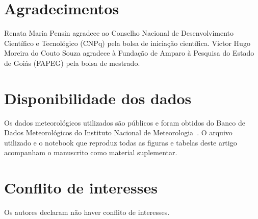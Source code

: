 \section*{Agradecimentos}
Renata Maria Pensin agradece ao Conselho Nacional de Desenvolvimento Científico e Tecnológico (CNPq) pela bolsa de iniciação científica. Victor Hugo Moreira do Couto Souza agradece à Fundação de Amparo à Pesquisa do Estado de Goiás (FAPEG) pela bolsa de mestrado.

\section*{Disponibilidade dos dados}
Os dados meteorológicos utilizados são públicos e foram obtidos do Banco de Dados Meteorológicos do Instituto Nacional de Meteorologia~\cite{inmet2025}. O arquivo utilizado e o notebook que reproduz todas as figuras e tabelas deste artigo acompanham o manuscrito como material suplementar.

\section*{Conflito de interesses}
Os autores declaram não haver conflito de interesses.
